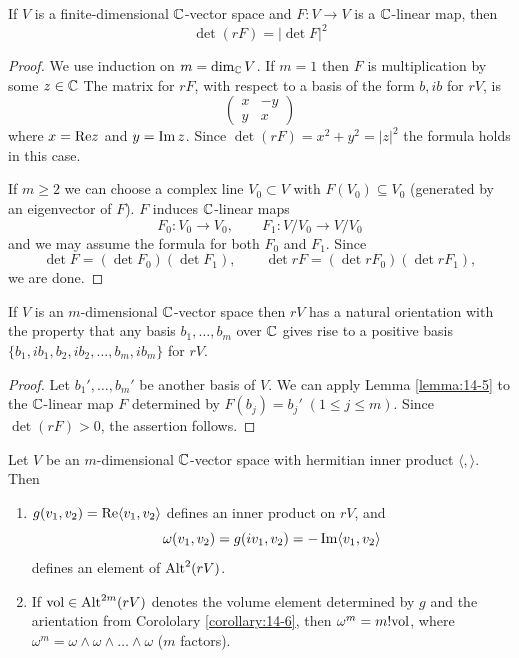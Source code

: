 \begin{lemma}\label{lemma:14-5}
  If $V$ is a finite-dimensional ${\mathbb{C}}$-vector space and $F:V\to V$ is a ${\mathbb{C}}$-linear map, then
  \[
    \det(rF) = |\det F|^2
  \]
\end{lemma}

\begin{proof}
  We use induction on $m = \dim_{{\mathbb{C}}} V$. If $m = 1$ then $F$ is multiplication by
some $z\in{\ensuremath{\mathbb{C}}}$ The matrix for $rF$, with respect to a basis of the form $b, ib$ for $rV$, is
\[
  \begin{pmatrix}
    x & -y \\
    y & x
  \end{pmatrix}
\]
where $x=\mathrm{Re} z$ and $y=\operatorname{Im} z$. Since $\det(rF)=x^2+y^2 = |z|^2$ the formula holds in this case.

If $m\ge 2$ we can choose a complex line $V_0\subset V$ with $F(V_0)\subseteq V_0$ (generated by
an eigenvector of $F$). $F$ induces ${\mathbb{C}}$-linear maps
\[
  F_0:V_0\to V_0, \qquad F_1:V/V_0\to V/V_0
\]
and we may assume the formula for both $F_0$ and $F_1$. Since
\[
  \det F = (\det F_0)(\det F_1), \qquad \det rF = (\det rF_0)(\det rF_1),
\]
we are done.
\end{proof}

\begin{corollary}\label{corollary:14-6}
  If $V$ is an $m$-dimensional ${\mathbb{C}}$-vector space then $rV$ has a natural
orientation with the property that any basis $b_1,\ldots, b_m$ over ${\mathbb{C}}$ gives rise to a
positive basis $\{b_1, ib_1, b_2, ib_2,\ldots, b_m, ib_m\}$ for $rV$.
\end{corollary}

\begin{proof}
  Let $b_1', \ldots, b_m'$ be another basis of $V$. We can apply Lemma \ref{lemma:14-5} to the
${\mathbb{C}}$-linear map $F$ determined by $F(b_j) = b_j'\; (1\le j\le m)$. Since $\det(rF) > 0$, the
assertion follows.
\end{proof}

\begin{proposition}\label{proposition:14-7}
  Let $V$ be an $m$-dimensional ${\mathbb{C}}$-vector space with hermitian inner product $\langle,\rangle$. Then
  \begin{enumerate}
    \item $g(v_1, v_2) = \mathrm{Re}\langle v_1, v_2\rangle$ defines an inner product on $rV$, and
      \[
        \omega(v_1, v_2) = g(iv_1, v_2) = -\operatorname{Im}\langle v_1, v_2\rangle
      \]
      defines an element of $\operatorname{Alt}^2(rV)$.
    \item If $\mathrm{vol}\in \operatorname{Alt}^{2m}(rV)$ denotes the volume element determined by $g$ and the arientation
      from Corololary \ref{corollary:14-6}, then $\omega^m=m!\mathrm{vol}$, 
      where $\omega^m=\omega\wedge\omega\wedge\ldots\wedge\omega$ ($m$ factors).
  \end{enumerate}
\end{proposition}

